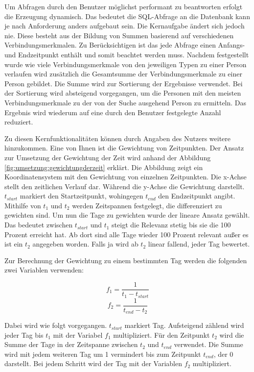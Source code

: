 Um Abfragen durch den Benutzer möglichst performant zu beantworten erfolgt die Erzeugung dynamisch. Das bedeutet die SQL-Abfrage an die Datenbank kann je nach Anforderung anders aufgebaut sein. Die Kernaufgabe ändert sich jedoch nie. Diese besteht aus der Bildung von Summen basierend auf verschiedenen Verbindungsmerkmalen. Zu Berücksichtigen ist das jede Abfrage einen Anfangs- und Endzeitpunkt enthält und somit beachtet werden muss. Nachdem festgestellt wurde wie viele Verbindungsmerkmale von den jeweiligen Typen zu einer Person verlaufen wird zusätzlich die Gesamtsumme der Verbindungsmerkmale zu einer Person gebildet. Die Summe wird zur Sortierung der Ergebnisse verwendet. Bei der Sortierung wird absteigend vorgegangen, um die Personen mit den meisten Verbindungsmerkmale zu der von der Suche ausgehend Person zu ermitteln. Das Ergebnis wird wiederum auf eine durch den Benutzer festgelegte Anzahl reduziert. 

Zu diesen Kernfunktionalitäten können durch Angaben des Nutzers weitere hinzukommen. Eine von Ihnen ist die Gewichtung von Zeitpunkten. Der Ansatz zur Umsetzung der Gewichtung der Zeit wird anhand der Abbildung \ref{fig:umsetzung:gewichtungderzeit} erklärt. Die Abbildung zeigt ein Koordinatensystem mit den Gewichtung von einzelnen Zeitpunkten. Die x-Achse stellt den zeitlichen Verlauf dar. Während die y-Achse die Gewichtung darstellt. $t_{start}$ markiert den Startzeitpunkt, wohingegen $t_{end}$ den Endzeitpunkt angibt. Mithilfe von $t_1$ und $t_2$ werden Zeitspannen festgelegt, die differenziert zu gewichten sind. Um nun die Tage zu gewichten wurde der lineare Ansatz gewählt. Das bedeutet zwischen $t_{start}$ und $t_1$ steigt die Relevanz stetig bis sie die 100 Prozent erreicht hat. Ab dort sind alle Tage wieder 100 Prozent relevant außer es ist ein $t_2$ angegeben worden. Falls ja wird ab $t_2$ linear fallend, jeder Tag bewertet. 

Zur Berechnung der Gewichtung zu einem bestimmten Tag werden die folgenden zwei Variablen verwenden:

\begin{equation}
f_1 = \frac{1}{t_1 - t_{start}}
\end{equation}
\begin{equation}
f_2 = \frac{1}{t_{end} - t_2}
\end{equation}

Dabei wird wie folgt vorgegangen. $t_{start}$ markiert Tag. Aufsteigend zählend wird jeder Tag bis $t_1$ mit der Variabel $f_1$ multipliziert. Für den Zeitpunkt $t_2$ wird die Summe der Tage in der Zeitspanne zwischen $t_2$ und $t_{end}$ verwendet. Die Summe wird mit jedem weiteren Tag um 1 vermindert bis zum Zeitpunkt $t_{end}$, der 0 darstellt. Bei jedem Schritt wird der Tag mit der Variablen $f_2$ multipliziert.

